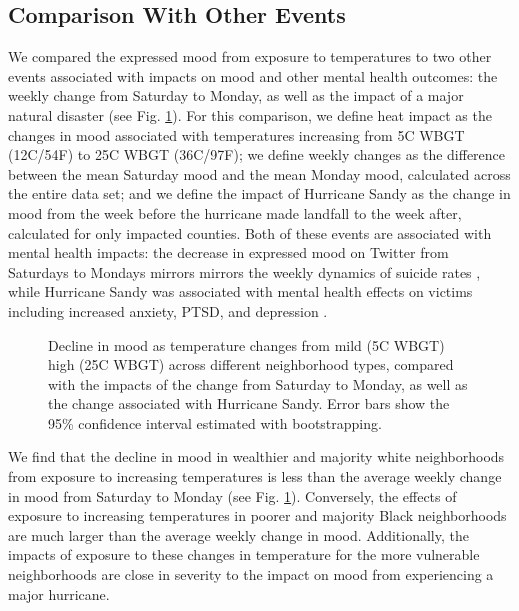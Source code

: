 \documentclass[titlepage]{article}
\begin{document}
\subsection*{Comparison With Other Events}
We compared the expressed mood from exposure to temperatures to two other events associated with impacts on mood and other mental health outcomes: the weekly change from Saturday to Monday, as well as the impact of a major natural disaster (see Fig. \ref{fig:compare}). For this comparison, we define heat impact as the changes in mood associated with temperatures increasing from 5\textdegree C WBGT (12\textdegree C/54\textdegree F) to 25\textdegree C WBGT (36\textdegree C/97\textdegree F); we define weekly changes as the difference between the mean Saturday mood and the mean Monday mood, calculated across the entire data set; and we define the impact of Hurricane Sandy as the change in mood from the week before the hurricane made landfall to the week after, calculated for only impacted counties. Both of these events are associated with mental health impacts: the decrease in expressed mood on Twitter from Saturdays to Mondays mirrors mirrors the weekly dynamics of suicide rates \citep{CDC2021}, while Hurricane Sandy was associated with mental health effects on victims including increased anxiety, PTSD, and depression \citep{Schwartz2017Aug, Lieberman-Cribbin2017}.

\begin{figure}[H]
 \centering
 \caption{Decline in mood as temperature changes from mild (5\textdegree C WBGT) high (25\textdegree C WBGT) across different neighborhood types, compared with the impacts of the change from Saturday to Monday, as well as the change associated with Hurricane Sandy.  Error bars show the 95\% confidence interval estimated with bootstrapping.}
 \label{fig:compare}
\end{figure}

We find that the decline in mood in wealthier and majority white neighborhoods from exposure to increasing temperatures is less than the average weekly change in mood from Saturday to Monday (see Fig. \ref{fig:compare}). Conversely, the effects of exposure to increasing temperatures in poorer and majority Black neighborhoods are much larger than the average weekly change in mood. Additionally, the impacts of exposure to these changes in temperature for the more vulnerable neighborhoods are close in severity to the impact on mood from experiencing a major hurricane.
\end{document}
